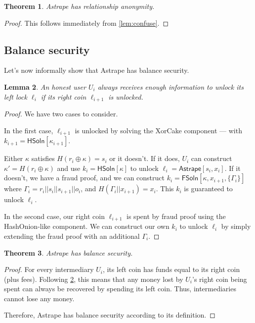 \documentclass[USenglish,oneside,twocolumn]{article}
\newtheorem{theorem}{Theorem}[section]
\newtheorem{lemma}[theorem]{Lemma}
\begin{document}
\begin{theorem}
    Astrape has relationship anonymity.
\end{theorem}

\begin{proof}
    This follows immediately from \ref{lem:confuse}.
\end{proof}

\subsection{Balance security}

Let's now informally show that Astrape has balance security.

\begin{lemma}\label{lem:balsec}
    An honest user $U_i$ always receives enough information to unlock its left lock $\ell_{i}$ if its right coin $\ell_{i+1}$ is unlocked.
\end{lemma}

\begin{proof}
    We have two cases to consider.

    In the first case, $\ell_{i+1}$ is unlocked by solving the XorCake component --- with $k_{i+1} = \mathsf{HSoln}[\kappa_{i+1}]$.

    Either $\kappa$ satisfies $H(r_i \oplus \kappa) = s_i$ or it doesn't. If it does, $U_i$ can construct $\kappa' = H(r_i \oplus \kappa)$ and use $k_i=\mathsf{HSoln}[\kappa]$ to unlock $\ell_i = \mathsf{Astrape}[s_i,x_i]$. If it doesn't, we have a fraud proof, and we can construct $k_i=\mathsf{FSoln}[\kappa, x_{i+1}, \{ \Gamma_i \}]$ where $\Gamma_i = r_i||s_i||s_{i+1}||o_i$, and $H(\Gamma_i||x_{i+1})=x_i$. This $k_i$ is guaranteed to unlock $\ell_i$.

    In the second case, our right coin $\ell_{i+1}$ is spent by fraud proof using the HashOnion-like component. We can construct our own $k_i$ to unlock $\ell_i$ by simply extending the fraud proof with an additional $\Gamma_i$.
\end{proof}

\begin{theorem}
    Astrape has balance security.
\end{theorem}

\begin{proof}
    For every intermediary $U_i$, its left coin has funds equal to its right coin (plus fees). Following \ref{lem:balsec}, this means that any money lost by $U_i$'s right coin being spent can always be recovered by spending its left coin. Thus, intermediaries cannot lose any money.

    Therefore, Astrape has balance security according to its definition.
\end{proof}
\end{document}

